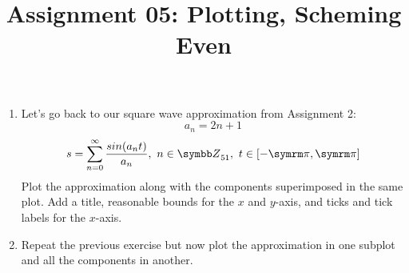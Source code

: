 \documentclass{article}
\title{Assignment 05: Plotting, Scheming Even}
\begin{document}
\renderTitle

\begin{enumerate}[leftmargin=*]
	\item
		Let's go back to our square wave approximation from
		Assignment 2:
		\begin{equation}
			a_n = 2n + 1
		\end{equation}
		\begin{equation}
			s
			=
			\sum_{n = 0}^\infty
			\frac{sin(a_n t)}{a_n},
			\ n \in \Z_{51},
			\ t \in [-\cpi, \cpi]
		\end{equation}
		Plot the approximation along with the components
		superimposed in the same plot.  Add a title, reasonable
		bounds for the \(x\) and \(y\)-axis, and ticks and tick
		labels for the \(x\)-axis.

	\item
		Repeat the previous exercise but now plot the
		approximation in one subplot and all the components in
		another.
\end{enumerate}
\end{document}
